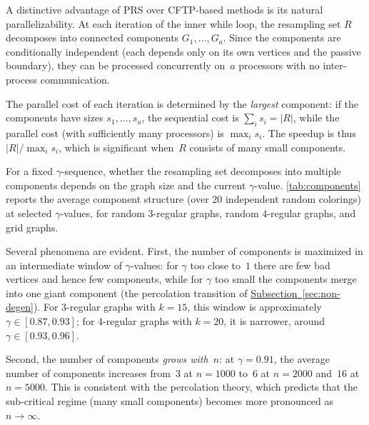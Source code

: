 \documentclass[12pt, a4paper]{article}
\theoremstyle{plain}
\theoremstyle{definition}
\theoremstyle{remark}
\newcommand{\sref}[2]{\hyperref[#2]{#1~\ref*{#2}}}
\begin{document}
A distinctive advantage of PRS over CFTP-based methods is its natural parallelizability. At each iteration of the inner while loop, the resampling set \(R\) decomposes into connected components \(G_1,\ldots,G_a\). Since the components are conditionally independent (each depends only on its own vertices and the passive boundary), they can be processed concurrently on~\(a\) processors with no inter-process communication.

The parallel cost of each iteration is determined by the {\em largest} component: if the components have sizes \(s_1,\ldots,s_a\), the sequential cost is \(\sum_i s_i = |R|\), while the parallel cost (with sufficiently many processors) is \(\max_i s_i\). The speedup is thus \(|R|/\max_i s_i\), which is significant when~\(R\) consists of many small components.

For a fixed \(\gamma\)-sequence, whether the resampling set decomposes into multiple components depends on the graph size and the current \(\gamma\)-value. \autoref{tab:components} reports the average component structure (over 20 independent random colorings) at selected \(\gamma\)-values, for random \(3\)-regular graphs, random \(4\)-regular graphs, and grid graphs.

Several phenomena are evident. First, the number of components is maximized in an intermediate window of \(\gamma\)-values: for \(\gamma\) too close to~\(1\) there are few bad vertices and hence few components, while for \(\gamma\) too small the components merge into one giant component (the percolation transition of \sref{Subsection}{sec:non-degen}). For \(3\)-regular graphs with \(k=15\), this window is approximately \(\gamma\in[0.87,0.93]\); for \(4\)-regular graphs with \(k=20\), it is narrower, around \(\gamma\in[0.93,0.96]\).

Second, the number of components {\em grows with~\(n\)}: at \(\gamma=0.91\), the average number of components increases from~\(3\) at \(n=1000\) to~\(6\) at \(n=2000\) and~\(16\) at \(n=5000\). This is consistent with the percolation theory, which predicts that the sub-critical regime (many small components) becomes more pronounced as \(n\to\infty\).
\end{document}
